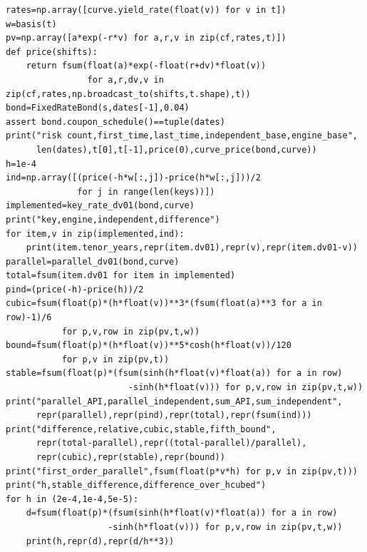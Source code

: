 \documentclass[12pt,a4paper]{article}
\begin{document}
\begin{verbatim}
rates=np.array([curve.yield_rate(float(v)) for v in t])
w=basis(t)
pv=np.array([a*exp(-r*v) for a,r,v in zip(cf,rates,t)])
def price(shifts):
    return fsum(float(a)*exp(-float(r+dv)*float(v))
                for a,r,dv,v in zip(cf,rates,np.broadcast_to(shifts,t.shape),t))
bond=FixedRateBond(s,dates[-1],0.04)
assert bond.coupon_schedule()==tuple(dates)
print("risk count,first_time,last_time,independent_base,engine_base",
      len(dates),t[0],t[-1],price(0),curve_price(bond,curve))
h=1e-4
ind=np.array([(price(-h*w[:,j])-price(h*w[:,j]))/2
              for j in range(len(keys))])
implemented=key_rate_dv01(bond,curve)
print("key,engine,independent,difference")
for item,v in zip(implemented,ind):
    print(item.tenor_years,repr(item.dv01),repr(v),repr(item.dv01-v))
parallel=parallel_dv01(bond,curve)
total=fsum(item.dv01 for item in implemented)
pind=(price(-h)-price(h))/2
cubic=fsum(float(p)*(h*float(v))**3*(fsum(float(a)**3 for a in row)-1)/6
           for p,v,row in zip(pv,t,w))
bound=fsum(float(p)*(h*float(v))**5*cosh(h*float(v))/120
           for p,v in zip(pv,t))
stable=fsum(float(p)*(fsum(sinh(h*float(v)*float(a)) for a in row)
                        -sinh(h*float(v))) for p,v,row in zip(pv,t,w))
print("parallel_API,parallel_independent,sum_API,sum_independent",
      repr(parallel),repr(pind),repr(total),repr(fsum(ind)))
print("difference,relative,cubic,stable,fifth_bound",
      repr(total-parallel),repr((total-parallel)/parallel),
      repr(cubic),repr(stable),repr(bound))
print("first_order_parallel",fsum(float(p*v*h) for p,v in zip(pv,t)))
print("h,stable_difference,difference_over_hcubed")
for h in (2e-4,1e-4,5e-5):
    d=fsum(float(p)*(fsum(sinh(h*float(v)*float(a)) for a in row)
                    -sinh(h*float(v))) for p,v,row in zip(pv,t,w))
    print(h,repr(d),repr(d/h**3))
\end{verbatim}
\endgroup
\end{document}
